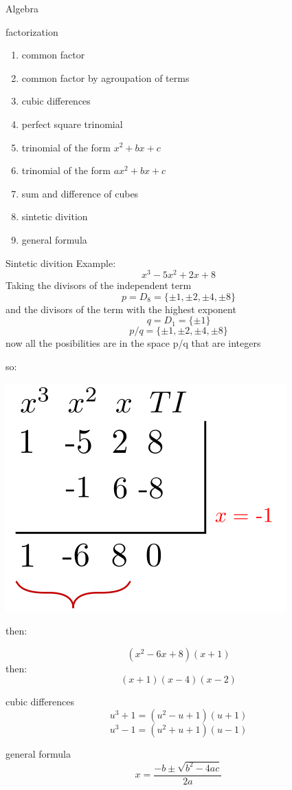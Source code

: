 \newpage
\begin{section}{Algebra}

\begin{subsection}{factorization}
\begin{enumerate}
	\item common factor
	\item common factor by agroupation of terms
	\item cubic differences
	\item perfect square trinomial
	\item trinomial of the form $x^2 + bx + c $ 
	\item trinomial of the form $ax^2 + bx + c $
	\item sum and difference of cubes
	\item sintetic divition
	\item general formula
\end{enumerate}
\end{subsection}

\newpage
	\begin{subsection}{Sintetic divition}
		Example:
		$$x^3 - 5x^2 + 2x + 8$$
		Taking the divisors of the independent term
		$$p = D_8 = \{\pm 1, \pm 2, \pm 4, \pm 8 \} $$
		and the divisors of the term with the highest exponent
		$$q = D_1 = \{\pm 1\} $$
		$$p/q = \{\pm 1, \pm 2, \pm 4, \pm 8 \} $$
		now all the posibilities are in the space p/q that are integers

		so:
		\begin{center}
		\includegraphics[scale = 0.8]{1.png}
		\end{center}
		then:

		$$(x^2 - 6x +8)(x+1) $$
		then:
		$$(x+1)(x-4)(x-2)$$
	\end{subsection}

	\begin{subsection}{cubic differences}
	$$u^3 + 1 = (u^2-u+1)(u+1)$$
	$$u^3 - 1 = (u^2+u+1)(u-1)$$
	\end{subsection}

	\begin{subsection}{general formula}
		$$x= \frac{ -b \pm \sqrt{b^2 - 4ac}}{2a}$$
	\end{subsection}


\end{section}
